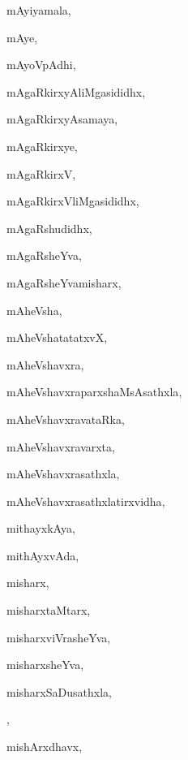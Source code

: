\begin{multicols}{3}
{\noindent
{mAyiyamala}, \pageref{mAyiyamala}

\noindent
{mAye}, \pageref{mAye}

\noindent
{mAyoVpAdhi}, \pageref{mAyoVpAdhi}

\noindent
{mAgaRkirxyAliMgasididhx}, \pageref{mAgaRkirxyAliMgasididhx}

\noindent
{mAgaRkirxyAsamaya}, \pageref{mAgaRkirxyAsamaya}

\noindent
{mAgaRkirxye}, \pageref{mAgaRkirxye}

\noindent
{mAgaRkirxV}, \pageref{mAgaRkirxV}

\noindent
{mAgaRkirxVliMgasididhx}, \pageref{mAgaRkirxVliMgasididhx}

\noindent
{mAgaRshudidhx}, \pageref{mAgaRshudidhx}

\noindent
{mAgaRsheYva}, \pageref{mAgaRsheYva}

\noindent
{mAgaRsheYvamisharx}, \pageref{mAgaRsheYvamisharx}

\noindent
{mAheVsha}, \pageref{mAheVsha}

\noindent
{mAheVshatatatxvX}, \pageref{mAheVshatatatxvX}

\noindent
{mAheVshavxra}, \pageref{mAheVshavxra}

\noindent
{mAheVshavxraparxshaMsAsathxla}, \pageref{mAheVshavxraparxshaMsAsathxla}

\noindent
{mAheVshavxravataRka}, \pageref{mAheVshavxravataRka}

\noindent
{mAheVshavxravarxta}, \pageref{mAheVshavxravarxta}

\noindent
{mAheVshavxrasathxla}, \pageref{mAheVshavxrasathxla}

\noindent
{mAheVshavxrasathxlatirxvidha}, \pageref{mAheVshavxrasathxlatirxvidha}

\noindent
{mithayxkAya}, \pageref{mithayxkAya}

\noindent
{mithAyxvAda}, \pageref{mithAyxvAda}

\noindent
{misharx}, \pageref{misharx}

\noindent
{misharxtaMtarx}, \pageref{misharxtaMtarx}

\noindent
{misharxviVrasheYva}, \pageref{misharxviVrasheYva}

\noindent
{misharxsheYva}, \pageref{misharxsheYva}

\noindent
{misharxSaDusathxla,}

\noindent
{}, \pageref{misharxSaDusathxla, misharxliMgApaRNa}

\noindent
{mishArxdhavx}, \pageref{mishArxdhavx}

}
\end{multicols}
